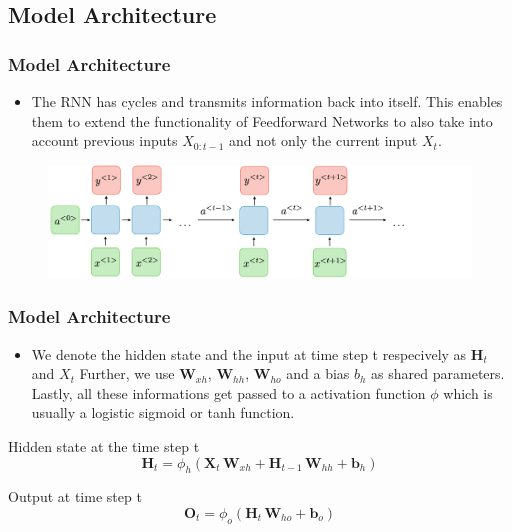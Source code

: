 \documentclass[
	11pt,
]{beamer}
\begin{document}
\subsection{Model Architecture}
\begin{frame}
	\frametitle{Model Architecture}
	\begin{itemize}
		\item The RNN has cycles and transmits information back into itself. This enables them to extend
	the functionality of Feedforward Networks to also take into account previous inputs $X_{0:t-1}$ and not only the current
	input $X_t$.
	\end{itemize}
	\begin{figure}
		\centering
		\includegraphics[scale=0.25]{Images/architecture-rnn-ltr.png}
	\end{figure}
\end{frame}
\begin{frame}
	\frametitle{Model Architecture}
	\begin{itemize}
		\item We denote the hidden state and the input at time step t respecively as $\mathbf{H}_t$ and $X_t$
Further, we use $\mathbf{W}_{xh}$, $\mathbf{W}_{hh}$, $\mathbf{W}_{ho}$ and a bias $b_h$ as shared parameters. Lastly, all these informations get passed to a activation function $\phi$ which is usually a logistic sigmoid or
tanh function.
	\end{itemize}
	\begin{block}{Hidden state at the time step t}
		\begin{equation*}
			\mathbf{H}_t = \phi_h(\mathbf{X}_t\,\mathbf{W}_{xh} + \mathbf{H}_{t-1}\,\mathbf{W}_{hh} + \mathbf{b}_h)
		\end{equation*}
	\end{block}
	\smallskip
	\begin{block}{Output at time step t}
		\begin{equation*}
			\mathbf{O}_t = \phi_o (\mathbf{H}_t\,\mathbf{W}_{ho} + \mathbf{b}_o)
		\end{equation*}
	\end{block}
\end{frame}
\end{document}
